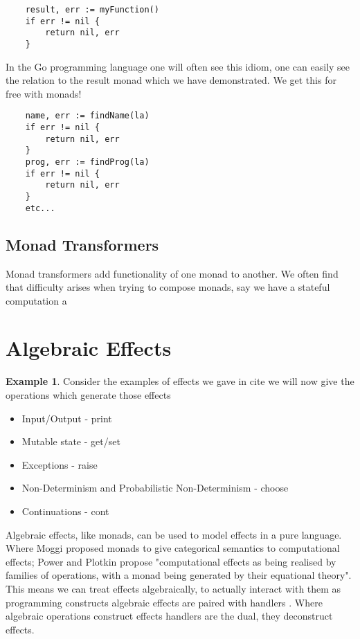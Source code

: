 \documentclass[a4paper,10pt]{article}
\theoremstyle{definition}
\newtheorem{example}{Example}[section]
\begin{document}
\begin{verbatim}
    result, err := myFunction()
    if err != nil {
        return nil, err
    }
\end{verbatim}

In the Go programming language one will often see this idiom,
one can easily see the relation to the result monad which we
have demonstrated.
We get this for free with monads!

\begin{verbatim}
    name, err := findName(la)
    if err != nil {
        return nil, err
    }
    prog, err := findProg(la)
    if err != nil {
        return nil, err
    }
    etc...
\end{verbatim}


\subsection{Monad Transformers}
Monad transformers add functionality of one monad to another.
We often find that difficulty arises when trying to compose monads,
say we have a stateful computation a



\pagebreak
\section{Algebraic Effects}

\begin{example}
    Consider the examples of effects we gave in cite
    we will now give the operations which generate those effects
    \begin{itemize}
        \item Input/Output - print
        \item Mutable state - get/set
        \item Exceptions - raise
        \item Non-Determinism and Probabilistic Non-Determinism - choose
        \item Continuations - cont
    \end{itemize}
\end{example}
Algebraic effects, like monads, can be used to model effects in a pure language.
Where Moggi \cite{moggi1989computational} proposed monads to give categorical semantics to computational effects;
Power and Plotkin \cite{Plotkin:2002dw} propose "computational effects as being realised by
families of operations, with a monad being generated by their equational theory".
This means we can treat effects algebraically,
to actually interact with them as programming constructs algebraic effects are paired with
handlers \cite{plotkin2009handlers}.
Where algebraic operations construct effects handlers are the dual, they deconstruct effects.
\end{document}
